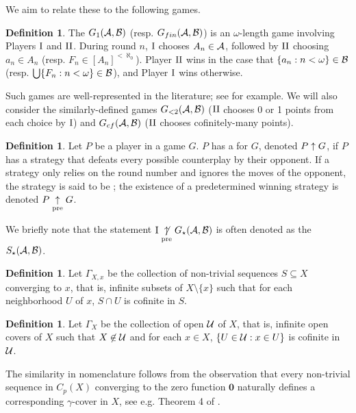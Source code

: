 \documentclass{amsart}
\renewcommand{\vec}{\mathbf}
\theoremstyle{plain}
\theoremstyle{definition}
\newtheorem{definition}[theorem]{Definition}
\theoremstyle{remark}
\theoremstyle{plain}
\theoremstyle{definition}
\theoremstyle{remark}
\begin{document}
We aim to relate these to the following games.

\begin{definition}
  The  \(G_1(\mathcal{A},\mathcal{B})\) (resp. \(G_{fin}(\mathcal{A},\mathcal{B})\))
  is an \(\omega\)-length game involving Players \(\mathrm{I}\) and \(\mathrm{II}\). 
  During round \(n\), \(\mathrm{I}\) chooses
  \(A_n\in\mathcal{A}\), followed by \(\mathrm{II}\) choosing \(a_n\in A_n\)
  (resp. \(F_n\in[A_n]^{<\aleph_0}\)).
  Player \(\mathrm{II}\) wins in the case that \(\{a_n:n<\omega\}\in\mathcal{B}\)
  (resp. \(\bigcup\{F_n:n<\omega\}\in\mathcal{B}\)),
  and Player \(\mathrm{I}\) wins otherwise.
\end{definition}

Such games are well-represented in the literature; see \cite{MR1378387}
for example.
We will also consider the similarly-defined games \(G_{<2}(\mathcal{A},\mathcal{B})\)
(\(\mathrm{II}\) chooses 0 or 1 points from each choice by \(\mathrm{I}\)) and \(G_{cf}(\mathcal{A},\mathcal{B})\)
(\(\mathrm{II}\) chooses cofinitely-many points).

\begin{definition}
  Let \(P\) be a player in a game \(G\). \(P\) has a 
  for \(G\), denoted \(P\uparrow G\), if \(P\) has a strategy that defeats every
  possible counterplay by their opponent. If a strategy only relies on the
  round number and ignores the moves of the opponent, the strategy is said
  to be ; the existence of a predetermined winning strategy
  is denoted \(P\underset{\text{pre}}{\uparrow} G\).
\end{definition}

We briefly note that the statement \(\mathrm{I}\underset{\text{pre}}{\not\uparrow} G_\star(\mathcal{A},\mathcal{B})\)
is often denoted as the  \(S_\star(\mathcal{A},\mathcal{B})\).

\begin{definition}
Let \(\Gamma_{X,x}\) be the collection of non-trivial sequences \(S\subseteq X\) converging to \(x\),
that is, infinite subsets of \(X\setminus\{x\}\) such that for each neighborhood \(U\) of \(x\),
\(S\cap U\) is cofinite in \(S\).
\end{definition}

\begin{definition}
Let \(\Gamma_X\) be the collection of open  \(\mathcal{U}\) of \(X\),
that is, infinite open covers of \(X\) such that \(X\not\in \mathcal{U}\) and for each \(x\in X\),
\(\{U\in\mathcal{U}:x\in U\}\) is cofinite in \(\mathcal{U}\).
\end{definition}

The similarity in nomenclature follows from the observation that every non-trivial sequence in
\(C_p(X)\) converging to the zero function \(\vec{0}\) naturally defines a corresponding
\(\gamma\)-cover in \(X\), see e.g. Theorem 4 of
\cite{MR1396994}.
\end{document}

